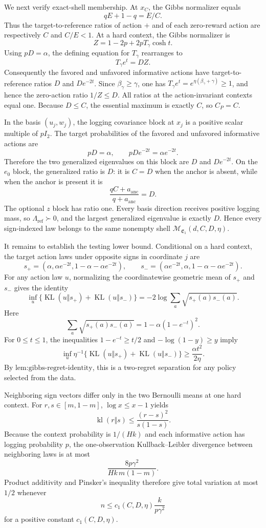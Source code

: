 We next verify exact-shell membership. At \(x_C\), the Gibbs normalizer equals
\[
qE+1-q=E/C.
\]
Thus the target-to-reference ratios of action \(+\) and of each zero-reward action are respectively \(C\) and \(C/E<1\). At a hard context, the Gibbs normalizer is
\[
Z=1-2p+2pT_\gamma\cosh t.
\]
Using \(pD=\alpha\), the defining equation for \(T_\gamma\) rearranges to
\[
T_\gamma e^t=DZ.
\]
Consequently the favored and unfavored informative actions have target-to-reference ratios \(D\) and \(De^{-2t}\). Since \(\beta_\gamma\ge\gamma\), one has \(T_\gamma e^t=e^{\eta(\beta_\gamma+\gamma)}\ge1\), and hence the zero-action ratio \(1/Z\le D\). All ratios at the action-invariant contexts equal one. Because \(D\le C\), the essential maximum is exactly \(C\), so \(C_P=C\).

In the basis \((u_j,w_j)\), the logging covariance block at \(x_j\) is a positive scalar multiple of \(pI_2\). The target probabilities of the favored and unfavored informative actions are
\[
pD=\alpha,\qquad pDe^{-2t}=\alpha e^{-2t}.
\]
Therefore the two generalized eigenvalues on this block are \(D\) and \(De^{-2t}\). On the \(e_0\) block, the generalized ratio is \(D\): it is \(C=D\) when the anchor is absent, while when the anchor is present it is
\[
\frac{qC+a_{\mathrm{anc}}}{q+a_{\mathrm{anc}}}=D.
\]
The optional \(z\) block has ratio one. Every basis direction receives positive logging mass, so \(\Lambda_{\mathrm{ref}}\succ0\), and the largest generalized eigenvalue is exactly \(D\). Hence every sign-indexed law belongs to the same nonempty shell \(\mathcal M_{\mathfrak E_1}(d,C,D,\eta)\).

It remains to establish the testing lower bound. Conditional on a hard context, the target action laws under opposite signs in coordinate \(j\) are
\[
s_+=(\alpha,\alpha e^{-2t},1-\alpha-\alpha e^{-2t}),
\qquad
s_-=(\alpha e^{-2t},\alpha,1-\alpha-\alpha e^{-2t}).
\]
For any action law \(u\), normalizing the coordinatewise geometric mean of \(s_+\) and \(s_-\) gives the identity
\[
\inf_u\{\operatorname{KL}(u\Vert s_+)+\operatorname{KL}(u\Vert s_-)\}
=-2\log\sum_a\sqrt{s_+(a)s_-(a)}.
\]
Here
\[
\sum_a\sqrt{s_+(a)s_-(a)}=1-\alpha(1-e^{-t})^2.
\]
For \(0\le t\le1\), the inequalities \(1-e^{-t}\ge t/2\) and \(-\log(1-y)\ge y\) imply
\[
\inf_u\eta^{-1}\{\operatorname{KL}(u\Vert s_+)+\operatorname{KL}(u\Vert s_-)\}
\ge\frac{\alpha t^2}{2\eta}.
\]
By \(\text{lem:gibbs-regret-identity}\), this is a two-regret separation for any policy selected from the data.

Neighboring sign vectors differ only in the two Bernoulli means at one hard context. For \(r,s\in[m,1-m]\), \(\log x\le x-1\) yields
\[
\operatorname{kl}(r\Vert s)\le\frac{(r-s)^2}{s(1-s)}.
\]
Because the context probability is \(1/(Hk)\) and each informative action has logging probability \(p\), the one-observation Kullback--Leibler divergence between neighboring laws is at most
\[
\frac{8p\gamma^2}{Hk\,m(1-m)}.
\]
Product additivity and Pinsker's inequality therefore give total variation at most \(1/2\) whenever
\[
n\le c_1(C,D,\eta)\frac{k}{p\gamma^2}
\]
for a positive constant \(c_1(C,D,\eta)\).

